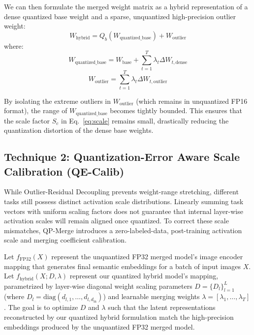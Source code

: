 We can then formulate the merged weight matrix as a hybrid representation of a dense quantized base weight and a sparse, unquantized high-precision outlier weight:
\begin{equation}
W_{\text{hybrid}} = Q_b(W_{\text{quantized\_base}}) + W_{\text{outlier}}
\label{eq:hybrid}
\end{equation}
where:
\begin{equation}
W_{\text{quantized\_base}} = W_{\text{base}} + \sum_{t=1}^T \lambda_t \Delta W_{t, \text{dense}}
\end{equation}
\begin{equation}
W_{\text{outlier}} = \sum_{t=1}^T \lambda_t \Delta W_{t, \text{outlier}}
\end{equation}

By isolating the extreme outliers in $W_{\text{outlier}}$ (which remains in unquantized FP16 format), the range of $W_{\text{quantized\_base}}$ becomes tightly bounded. This ensures that the scale factor $S_c$ in Eq.~\ref{eq:scale} remains small, drastically reducing the quantization distortion of the dense base weights.

\subsection{Technique 2: Quantization-Error Aware Scale Calibration (QE-Calib)}
While Outlier-Residual Decoupling prevents weight-range stretching, different tasks still possess distinct activation scale distributions. Linearly summing task vectors with uniform scaling factors does not guarantee that internal layer-wise activation scales will remain aligned once quantized. To correct these scale mismatches, QP-Merge introduces a zero-labeled-data, post-training activation scale and merging coefficient calibration.

Let $f_{\text{FP32}}(X)$ represent the unquantized FP32 merged model's image encoder mapping that generates final semantic embeddings for a batch of input images $X$. Let $f_{\text{hybrid}}(X; D, \lambda)$ represent our quantized hybrid model's mapping, parametrized by layer-wise diagonal weight scaling parameters $D = \{D_l\}_{l=1}^L$ (where $D_l = \text{diag}(d_{l, 1}, \dots, d_{l, d_{\text{in}}})$) and learnable merging weights $\lambda = [\lambda_1, \dots, \lambda_T]$. The goal is to optimize $D$ and $\lambda$ such that the latent representations reconstructed by our quantized hybrid formulation match the high-precision embeddings produced by the unquantized FP32 merged model.

